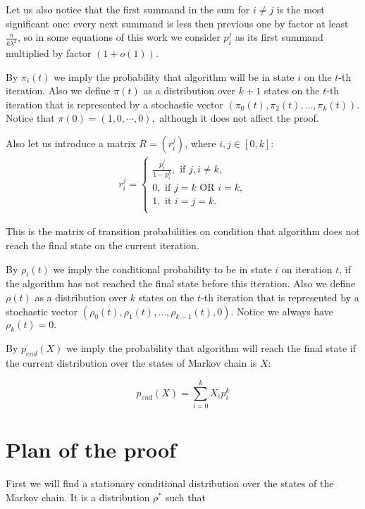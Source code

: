 \documentclass{article}
\begin{document}
Let us also notice that the first summand in the sum for $i \ne j$ is the most significant one: every next summand is less then previous one by factor at least $\frac{n}{k\lambda^2}$, so in some equations of this work we consider $p_i^j$ as its first summand multiplied by factor $(1 + o(1)).$

By $\pi_i(t)$ we imply the probability that algorithm will be in state $i$ on the $t$-th iteration. Also we define $\pi(t)$ as a distribution over $k + 1$ states on the $t$-th iteration that is represented by a stochastic vector $(\pi_0(t), \pi_2(t), \dots, \pi_k(t)).$ Notice that $\pi(0) = (1, 0, \cdots, 0),$ although it does not affect the proof.

Also let us introduce a matrix $R = (r_i^j)$, where $i, j \in [0, k]:$
\begin{align*}
  r_i^j = \begin{cases}
    \frac{p_i^j}{1 - p_i^k}, \text{ if } j, i \ne k, \\
    0, \text{ if } j = k \text{ OR } i = k, \\
    1, \text{ it } i = j = k. \\
  \end{cases}
\end{align*}

This is the matrix of transition probabilities on condition that algorithm does not reach the final state on the current iteration.

By $\rho_i(t)$ we imply the conditional probability to be in state $i$ on iteration $t$, if the algorithm has not reached the final state before this iteration. Also we define $\rho(t)$ as a distribution over $k$ states on the $t$-th iteration that is represented by a stochastic vector $(\rho_0(t), \rho_1(t), \dots, \rho_{k - 1}(t), 0).$ Notice we always have $\rho_k(t) = 0.$

By $p_{end}(X)$ we imply the probability that algorithm will reach the final state if the current distribution over the states of Markov chain is $X$:

$$p_{end}(X) = \sum\limits_{i = 0}^k X_i p_i^k$$

\section{Plan of the proof}

First we will find a stationary conditional distribution over the states of the Markov chain. It is a distribution $\rho^*$ such that
\end{document}
